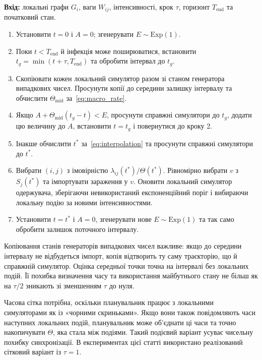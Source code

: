 \documentclass[a4paper,fleqn]{cas-sc}
\newcommand{\Exp}{\mathrm{Exp}}
\begin{document}
\begin{algorithm}[tbp]
\color{black}
\caption{\textcolor{black}{Один запуск двомасштабного симулятора з узгодженням за часовою сіткою.}}
\label{alg:scheduler}
\small

\textbf{Вхід:} локальні графи $G_i$, ваги $W_{ij}$, інтенсивності, крок $\tau$, горизонт $T_{\mathrm{end}}$ та початковий стан.
\begin{enumerate}
\item Установити $t=0$ і $A=0$; згенерувати $E\sim\Exp(1)$.
\item Поки $t<T_{\mathrm{end}}$ й інфекція може поширюватися, встановити $t_g=\min(t+\tau,T_{\mathrm{end}})$ та обробити інтервал до $t_g$.
\item Скопіювати кожен локальний симулятор разом зі станом генератора випадкових чисел. Просунути копії до середини залишку інтервалу та обчислити $\Theta_{\mathrm{mid}}$ за~\eqref{eq:macro_rate}.
\item Якщо $A+\Theta_{\mathrm{mid}}(t_g-t)<E$, просунути справжні симулятори до $t_g$, додати цю величину до $A$, встановити $t=t_g$ і повернутися до кроку 2.
\item Інакше обчислити $t^\ast$ за~\eqref{eq:interpolation} та просунути справжні симулятори до $t^\ast$.
\item Вибрати $(i,j)$ з імовірністю $\lambda_{ij}(t^\ast)/\Theta(t^\ast)$. Рівномірно вибрати $v$ з $S_j(t^\ast)$ та імпортувати зараження у $v$. Оновити локальний симулятор одержувача, зберігаючи невикористаний експоненційний поріг і вибираючи локальну подію за новими інтенсивностями.
\item Установити $t=t^\ast$ і $A=0$, згенерувати нове $E\sim\Exp(1)$ та так само обробити залишок поточного інтервалу.
\end{enumerate}

\end{algorithm}

Копіювання станів генераторів випадкових чисел важливе: якщо до середини інтервалу не відбудеться імпорт, копія відтворить ту саму траєкторію, що й справжній симулятор. Оцінка середньої точки точна на інтервалі без локальних подій. Її похибка визначення часу та використання майбутнього стану не більш як на $\tau/2$ зникають зі зменшенням $\tau$ до нуля.

Часова сітка потрібна, оскільки планувальник працює з локальними симуляторами як із «чорними скриньками». Якщо вони також повідомляють часи наступних локальних подій, планувальник може об'єднати ці часи та точно накопичувати $\Theta$, яка стала між подіями. Такий подієвий варіант усуває чисельну похибку синхронізації. В експериментах цієї статті використано реалізований сітковий варіант із $\tau=1$.
\end{document}
